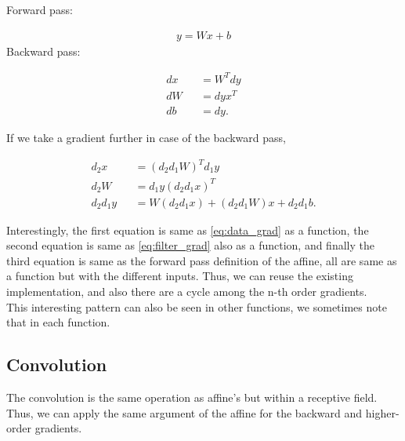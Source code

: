 \documentclass{article}
\begin{document}
Forward pass:

\begin{eqnarray}
  y = Wx + b
\end{eqnarray}
%
Backward pass:

\begin{eqnarray}
  dx &&= W^T dy \label{eq:data_grad} \\
  dW &&= dy x^T \label{eq:filter_grad}\\
  db &&= dy.
\end{eqnarray}

If we take a gradient further in case of the backward pass,

\begin{eqnarray}
  d_2 x &&= (d_2d_1 W)^T d_1y \\
  d_2 W &&= d_1y (d_2d_1 x)^T \\
  d_2d_1 y &&= W (d_2d_1 x) + (d_2d_1 W) x + d_2d_1b.
\end{eqnarray}

Interestingly, the first equation is same as \eqref{eq:data_grad} as a function, the second equation is same as \eqref{eq:filter_grad} also as a function, and finally the third equation is same as the forward pass definition of the affine, all are same as a function but with the different inputs. Thus, we can reuse the existing implementation, and also there are a cycle among the n-th order gradients.\\

This interesting pattern can also be seen in other functions, we sometimes note that in each function.

\subsection{Convolution}

The convolution is the same operation as affine's but within a receptive field. Thus, we can apply the same argument of the affine for the backward and higher-order gradients.




\end{document}
